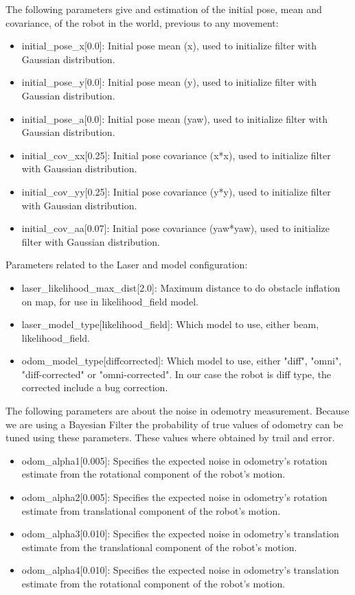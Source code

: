 \documentclass[10pt,journal,compsoc]{IEEEtran}
\begin{document}
The following parameters give and estimation of the initial pose, mean and covariance, of the robot in the world, previous to any movement:

\begin{itemize}
\item initial\_pose\_x[0.0]: Initial pose mean (x), used to initialize filter with Gaussian distribution.
\item initial\_pose\_y[0.0]: Initial pose mean (y), used to initialize filter with Gaussian distribution.
\item initial\_pose\_a[0.0]: Initial pose mean (yaw), used to initialize filter with Gaussian distribution.
\item initial\_cov\_xx[0.25]: Initial pose covariance (x*x), used to initialize filter with Gaussian distribution.
\item initial\_cov\_yy[0.25]: Initial pose covariance (y*y), used to initialize filter with Gaussian distribution.
\item initial\_cov\_aa[0.07]: Initial pose covariance (yaw*yaw), used to initialize filter with Gaussian distribution.
\end{itemize}

Parameters related to the Laser and model configuration:

\begin{itemize}
\item laser\_likelihood\_max\_dist[2.0]: Maximum distance to do obstacle inflation on map, for use in likelihood\_field model.
\item laser\_model\_type[likelihood\_field]: Which model to use, either beam, likelihood\_field.
\item odom\_model\_type[diff\-corrected]: Which model to use, either "diff", "omni", "diff-corrected" or "omni-corrected". In our case the robot is diff type, the corrected include a bug correction.
\end{itemize}

The following parameters are about the noise in odemotry measurement. Because we are using a Bayesian Filter the probability of true values of odometry can be tuned using these parameters. These values where obtained by trail and error.

\begin{itemize}
\item odom\_alpha1[0.005]: Specifies the expected noise in odometry's rotation estimate from the rotational component of the robot's motion.
\item odom\_alpha2[0.005]: Specifies the expected noise in odometry's rotation estimate from translational component of the robot's motion. 
\item odom\_alpha3[0.010]: Specifies the expected noise in odometry's translation estimate from the translational component of the robot's motion. 
\item odom\_alpha4[0.010]: Specifies the expected noise in odometry's translation estimate from the rotational component of the robot's motion.
\end{itemize}
\end{document}
